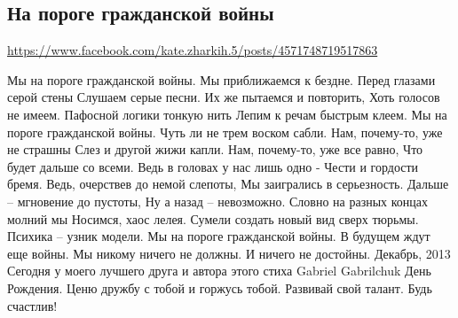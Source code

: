  
 
 
 
 

\subsection{На пороге гражданской войны}
\url{https://www.facebook.com/kate.zharkih.5/posts/4571748719517863}

Мы на пороге гражданской войны.
Мы приближаемся к бездне.
Перед глазами серой стены 
Слушаем серые песни.
Их же пытаемся и повторить,
Хоть голосов не имеем.
Пафосной логики тонкую нить
Лепим к речам быстрым клеем.
Мы на пороге гражданской войны.
Чуть ли не трем воском сабли.
Нам, почему-то, уже не страшны
Слез и другой жижи капли.
Нам, почему-то, уже все равно,
Что будет дальше со всеми.
Ведь в головах у нас лишь одно - 
Чести и гордости бремя.
Ведь, очерствев до немой слепоты,
Мы заигрались в серьезность.
Дальше – мгновение до пустоты,
Ну а назад – невозможно.
Словно на разных концах молний мы
Носимся, хаос лелея.
Сумели создать новый вид сверх тюрьмы.
Психика – узник модели.
Мы на пороге гражданской войны.
В будущем ждут еще войны.
Мы никому ничего не должны.
И ничего не достойны.
Декабрь, 2013
Сегодня у моего лучшего друга и автора этого стиха Gabriel Gabrilchuk
 День Рождения. Ценю дружбу с тобой и горжусь тобой. Развивай свой талант. Будь счастлив!
